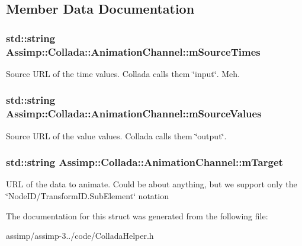 \subsection{Member Data Documentation}
\hypertarget{struct_assimp_1_1_collada_1_1_animation_channel_aed94e0b4e662d7faf092c6d102f0c512}{
\subsubsection[{m\+Source\+Times}]{\setlength{\rightskip}{0pt plus 5cm}std\+::string Assimp\+::\+Collada\+::\+Animation\+Channel\+::m\+Source\+Times}}\label{struct_assimp_1_1_collada_1_1_animation_channel_aed94e0b4e662d7faf092c6d102f0c512}
Source U\+R\+L of the time values. Collada calls them \char`\"{}input\char`\"{}. Meh. \hypertarget{struct_assimp_1_1_collada_1_1_animation_channel_a97913fbc6b259a9b79123de6067a838b}{
\subsubsection[{m\+Source\+Values}]{\setlength{\rightskip}{0pt plus 5cm}std\+::string Assimp\+::\+Collada\+::\+Animation\+Channel\+::m\+Source\+Values}}\label{struct_assimp_1_1_collada_1_1_animation_channel_a97913fbc6b259a9b79123de6067a838b}
Source U\+R\+L of the value values. Collada calls them \char`\"{}output\char`\"{}. \hypertarget{struct_assimp_1_1_collada_1_1_animation_channel_a97468bb33e251b8856e52c244b3329e2}{
\subsubsection[{m\+Target}]{\setlength{\rightskip}{0pt plus 5cm}std\+::string Assimp\+::\+Collada\+::\+Animation\+Channel\+::m\+Target}}\label{struct_assimp_1_1_collada_1_1_animation_channel_a97468bb33e251b8856e52c244b3329e2}
U\+R\+L of the data to animate. Could be about anything, but we support only the \char`\"{}\+Node\+I\+D/\+Transform\+I\+D.\+Sub\+Element\char`\"{} notation 

The documentation for this struct was generated from the following file\+:\begin{DoxyCompactItemize}
\item 
assimp/assimp-\/3../code/Collada\+Helper.\+h\end{DoxyCompactItemize}
